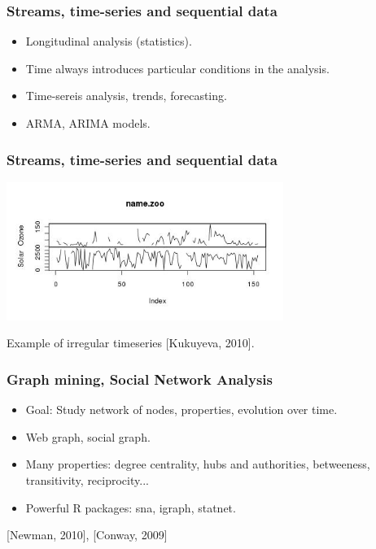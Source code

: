 \begin{frame}
\frametitle{Streams, time-series and sequential data}

\begin{itemize}
 \item Longitudinal analysis (statistics).
 \item Time always introduces particular conditions in the analysis.
 \item Time-sereis analysis, trends, forecasting.
 \item ARMA, ARIMA models.
\end{itemize}


\end{frame}


\begin{frame}
\frametitle{Streams, time-series and sequential data}

\begin{center}
 \includegraphics[height=4.5cm]{figs/timeseries.jpg}
\end{center}

\begin{flushright}
\small Example of irregular timeseries [Kukuyeva, 2010].
\end{flushright}

\end{frame}


\begin{frame}
\frametitle{Graph mining, Social Network Analysis}

\begin{itemize}
 \item Goal: Study network of nodes, properties, evolution over time.
 \item Web graph, social graph.
 \item Many properties: degree centrality, hubs and authorities, betweeness, transitivity, reciprocity...
 \item Powerful R packages: sna, igraph, statnet.
\end{itemize}

\begin{flushright}
\small [Newman, 2010], [Conway, 2009]
\end{flushright}

\end{frame}

